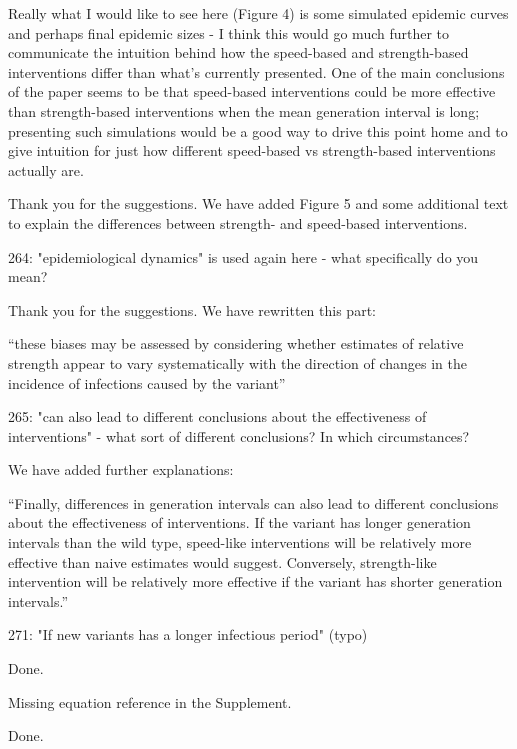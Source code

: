 \documentclass[12pt]{article}
\newcommand{\revtext}{\textsf}
\begin{document}
\revtext{Really what I would like to see here (Figure 4) is some simulated epidemic curves and perhaps final epidemic sizes - I think this would go much further to communicate the intuition behind how the speed-based and strength-based interventions differ than what's currently presented. One of the main conclusions of the paper seems to be that speed-based interventions could be more effective than strength-based interventions when the mean generation interval is long; presenting such simulations would be a good way to drive this point home and to give intuition for just how different speed-based vs strength-based interventions actually are.}

Thank you for the suggestions. We have added Figure 5 and some additional text to explain the differences between strength- and speed-based interventions.

\revtext{264: "epidemiological dynamics" is used again here - what specifically do you mean?}

Thank you for the suggestions. We have rewritten this part:

``these biases may be assessed by considering whether estimates of relative strength appear to vary systematically with the direction of changes in the incidence of infections caused by the variant''

\revtext{265: "can also lead to different conclusions about the effectiveness of interventions" - what sort of different conclusions? In which circumstances?}

We have added further explanations:

``Finally, differences in generation intervals can also lead to different conclusions about the effectiveness of interventions.
If the variant has longer generation intervals than the wild type, speed-like interventions will be relatively more effective than naive estimates would suggest. 
Conversely, strength-like intervention will be relatively more effective if the variant has shorter generation intervals.''

\revtext{271: "If new variants has a longer infectious period" (typo)}

Done.

\revtext{Missing equation reference in the Supplement.}

Done.


\end{document}
